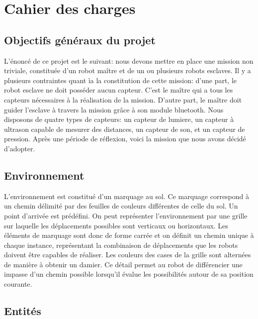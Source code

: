 \section{Cahier des charges}

  \subsection{Objectifs généraux du projet}

  L'\'{e}nonc\'{e} de ce projet est le suivant: nous devons mettre en place une mission non triviale, constitu\'{e}e d'un robot ma\^{i}tre et de un ou plusieurs robots esclaves. Il y a plusieurs contraintes quant \`{i}a la constitution de cette mission: d'une part, le robot esclave ne doit poss\'{e}der aucun capteur. C'est le ma\^{i}tre qui a tous les capteurs n\'{e}cessaires à la réalisation de la mission. D'autre part, le ma\^{i}tre doit guider l'esclave \`{a} travers la mission gr\^{a}ce à son module bluetooth. Nous disposons de quatre types de capteurs: un capteur de lumiere, un capteur à ultrason capable de mesurer des distances, un capteur de son, et un capteur de pression. Après une p\'{e}riode de r\'{e}flexion, voici la mission que nous avons d\'{e}cid\'{e} d'adopter.

  \subsection{Environnement}
  L'environnement est constitu\'{e} d'un marquage au sol. Ce marquage
  correspond \`{a} un chemin d\'{e}limit\'{e} par des feuilles de couleurs
  diff\'{e}rentes de celle du sol. Un point d'arriv\'{e}e est pr\'{e}d\'{e}fini. On peut
  repr\'{e}senter l'environnement par une grille sur laquelle les
  d\'{e}placements possibles sont verticaux ou horizontaux. Les \'{e}l\'{e}ments de
  marquage sont donc de forme carr\'{e}e et on d\'{e}finit un chemin unique à chaque instance,
  repr\'{e}sentant la combinaison de d\'{e}placements que les robots doivent
  \^{e}tre capables de r\'{e}aliser. Les couleurs des cases de la grille sont
  altern\'{e}es de mani\`{e}re \`{a} obtenir un damier. Ce d\'{e}tail permet au robot de
  diff\'{e}rencier une impasse d'un chemin possible lorsqu'il \'{e}value les
  possibilit\'{e}s autour de sa position courante.

  \subsection{Entit\'{e}s}

